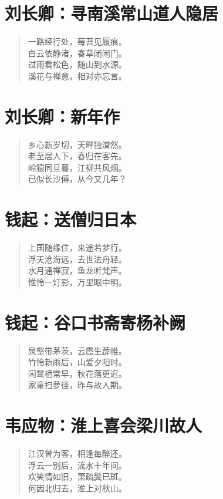 \documentclass[12pt,oneside]{book}
\newenvironment{shici}{
\begin{verse}
\centering\large\hspace{12pt}}
{\end{verse}}
\begin{document}
\chapter{刘长卿：寻南溪常山道人隐居}
\begin{shici}
一路经行处，莓苔见履痕。\\
白云依静渚，春草闭闲门。\\
过雨看松色，随山到水源。\\
溪花与禅意，相对亦忘言。
\end{shici}

\chapter{刘长卿：新年作}
\begin{shici}
乡心新岁切，天畔独潸然。\\
老至居人下，春归在客先。\\
岭猿同旦暮，江柳共风烟。\\
已似长沙傅，从今又几年？
\end{shici}

\chapter{钱起：送僧归日本}
\begin{shici}
上国随缘住，来途若梦行。\\
浮天沧海远，去世法舟轻。\\
水月通禅寂，鱼龙听梵声。\\
惟怜一灯影，万里眼中明。
\end{shici}

\chapter{钱起：谷口书斋寄杨补阙}
\begin{shici}
泉壑带茅茨，云霞生薜帷。\\
竹怜新雨后，山爱夕阳时。\\
闲鹭栖常早，秋花落更迟。\\
家童扫萝径，昨与故人期。
\end{shici}

\chapter{韦应物：淮上喜会梁川故人}
\begin{shici}
江汉曾为客，相逢每醉还。\\
浮云一别后，流水十年间。\\
欢笑情如旧，萧疏鬓已斑。\\
何因北归去，淮上对秋山。
\end{shici}
\end{document}
